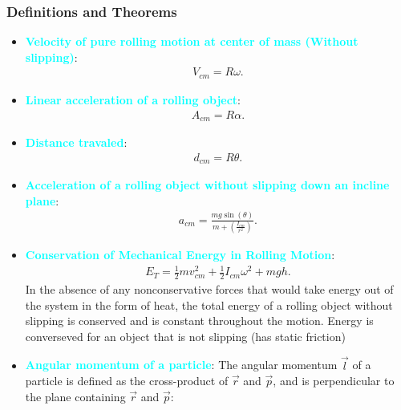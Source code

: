 \documentclass{report}
\begin{document}
    \subsubsection{Definitions and Theorems}
    \begin{itemize}
        \item \textbf{\textcolor{cyan}{Velocity of pure rolling motion at center of mass (Without slipping)}}: 
            \begin{align*}
                V_{cm} = R\omega
            .\end{align*}
        \item \textbf{\textcolor{cyan}{Linear acceleration of a rolling object}}:
            \begin{align*}
                A_{cm} = R\alpha
            .\end{align*}
        \item \textbf{\textcolor{cyan}{Distance travaled}}:
            \begin{align*}
                d_{cm} = R\theta
            .\end{align*}
        \item \textbf{\textcolor{cyan}{Acceleration of a rolling object without slipping down an incline plane}}:
            \begin{align*}
                a_{cm} = \frac{mg\sin{\left(\theta \right)}}{m+  \left(\frac{I_{cm}}{r^{2}}\right)}
            .\end{align*}
        \item \textbf{\textcolor{cyan}{Conservation of Mechanical Energy in Rolling Motion}}:
            \begin{align*}
                E_{T} = \frac{1}{2}mv^{2}_{cm} + \frac{1}{2}I_{cm}\omega^{2} + mgh
            .\end{align*}
            \bigbreak \noindent 
            In the absence of any nonconservative forces that would take energy out of the system in the form of heat, the total energy of a rolling object without slipping is conserved and is constant throughout the motion.
            \bigbreak \noindent 
            Energy is converseved for an object that is not slipping (has static friction)
        \item \textbf{\textcolor{cyan}{Angular momentum of a particle}}:
            The angular momentum $\vec{l}$ of a particle is defined as the cross-product of $\vec{r}$ and $\vec{p}$, and is perpendicular to the plane containing $\vec{r}$ and $\vec{p}$:
            \begin{align*}

\end{align*}
\end{itemize}
\end{document}
